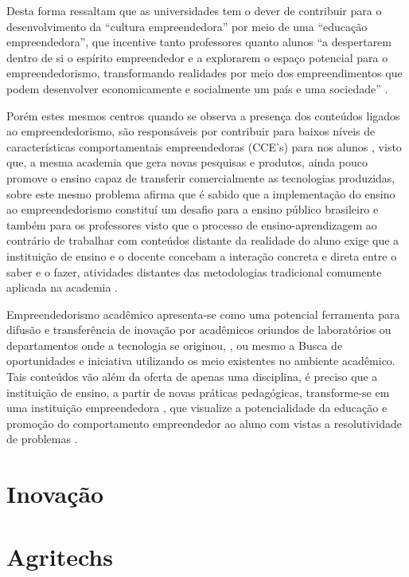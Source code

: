 Desta forma  ressaltam que as universidades tem o dever de contribuir para o desenvolvimento da “cultura empreendedora” por meio de uma “educação empreendedora”, que incentive tanto professores quanto alunos “a despertarem dentro de si o espírito empreendedor e a explorarem o espaço potencial para o empreendedorismo, transformando realidades por meio dos empreendimentos que podem desenvolver economicamente e socialmente um país e uma sociedade” \cite{tscha_empreendendo_2014}. 

Porém estes mesmos centros quando se observa a presença dos conteúdos ligados ao empreendedorismo, são responsáveis por contribuir para baixos níveis de características comportamentais empreendedoras (CCE’s) para nos alunos \cite{minello_caracteristicas_2017}, visto que, a mesma academia que gera novas pesquisas e produtos, ainda pouco promove o ensino capaz de transferir comercialmente as  tecnologias produzidas, sobre este mesmo problema  afirma que é sabido que a implementação do ensino ao empreendedorismo constituí um desafio para a ensino público brasileiro e também para os professores visto que o processo de ensino-aprendizagem ao contrário de trabalhar com conteúdos distante da realidade do aluno exige que a instituição de ensino e o docente concebam a interação concreta e direta entre o saber e o fazer, atividades distantes das metodologias tradicional comumente aplicada na academia \cite{saviani_historia_2019}. 

Empreendedorismo acadêmico apresenta-se como uma potencial ferramenta para difusão e transferência de inovação por acadêmicos oriundos de laboratórios ou departamentos onde a tecnologia se originou, \cite{guo_what_2019, abreu_nature_2013}, ou mesmo a Busca de oportunidades e iniciativa utilizando os meio existentes no ambiente acadêmico. Tais conteúdos vão além da oferta de apenas uma disciplina, é preciso que a instituição de ensino, a partir de novas práticas pedagógicas, transforme-se em uma instituição empreendedora \cite{campelli_empreendedorismo_2011}, que visualize a potencialidade da educação e promoção do comportamento empreendedor ao aluno com vistas a resolutividade de problemas \cite{degen_o_1989}.



\section{Inovação}
\section{Agritechs}


